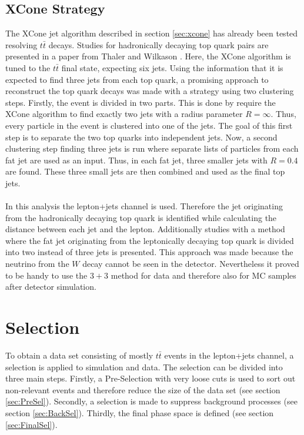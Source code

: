 \subsection{XCone Strategy}
	The XCone jet algorithm described in section \ref{sec:xcone} has already been tested resolving $t\bar{t}$ decays. Studies for hadronically decaying top quark pairs are presented in a paper from Thaler and Wilkason \cite{xconetop}. Here, the XCone algorithm is tuned to the $t\bar{t}$ final state, expecting six jets. Using the information that it is expected to find three jets from each top quark, a promising approach to reconstruct the top quark decays was made with a strategy using two clustering steps. Firstly, the event is divided in two parts. This is done by require the XCone algorithm to find exactly two jets with a radius parameter $R=\infty$. Thus, every particle in the event is clustered into one of the jets. The goal of this first step is to separate the two top quarks into independent jets. Now, a second clustering step finding three jets is run where separate lists of particles from each fat jet are used as an input. Thus, in each fat jet, three smaller jets with $R=0.4$ are found. These three small jets are then combined and used as the final top jets. \\
	\\ In this analysis the lepton+jets channel is used. Therefore the jet originating from the hadronically decaying top quark is identified while calculating the distance between each jet and the lepton. Additionally studies with a method where the fat jet originating from the leptonically decaying top quark is divided into two instead of three jets is presented. This approach was made because the neutrino from the $W$ decay cannot be seen in the detector. Nevertheless it proved to be handy to use the $3+3$ method for data and therefore also for MC samples after detector simulation.   
	
\section{Selection}
	To obtain a data set consisting of mostly $t\bar{t}$ events in the lepton+jets channel, a selection is applied to simulation and data. The selection can be divided into three main steps. Firstly, a Pre-Selection with very loose cuts is used to sort out non-relevant events and therefore reduce the size of the data set (see section \ref{sec:PreSel}). Secondly, a selection is made to suppress background processes (see section \ref{sec:BackSel}). Thirdly, the final phase space is defined (see section \ref{sec:FinalSel}).
